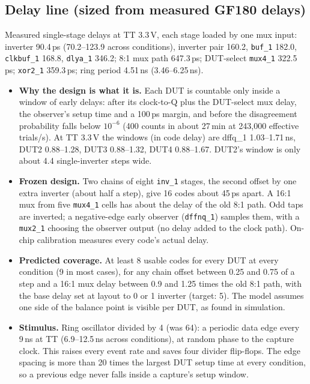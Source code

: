 \documentclass[11pt]{article}
\begin{document}
\subsection{Delay line (sized from measured GF180 delays)}
Measured single-stage delays at TT 3.3\,V, each stage loaded by one mux input: inverter 90.4\,ps (70.2--123.9 across
conditions), inverter pair 160.2, \texttt{buf\_1} 182.0, \texttt{clkbuf\_1} 168.8, \texttt{dlya\_1} 346.2; 8:1 mux path
647.3\,ps; DUT-select \texttt{mux4\_1} 322.5\,ps; \texttt{xor2\_1} 359.3\,ps; ring period 4.51\,ns (3.46--6.25\,ns).
\begin{itemize}
\item \textbf{Why the design is what it is.} Each DUT is countable only inside a window of early delays: after its
  clock-to-Q plus the DUT-select mux delay, the observer's setup time and a 100\,ps margin, and before the
  disagreement probability falls below $10^{-6}$ (400 counts in about 27\,min at 243{,}000 effective trials/s). At TT 3.3\,V the windows (in code delay) are dffq\_1 1.03--1.71\,ns, DUT2 0.88--1.28, DUT3
  0.88--1.32, DUT4 0.88--1.67. DUT2's window is only about 4.4 single-inverter steps wide.
\item \textbf{Frozen design.} Two chains of eight \texttt{inv\_1} stages, the second offset by one extra inverter
  (about half a step), give 16 codes about 45\,ps apart. A 16:1 mux from five \texttt{mux4\_1} cells has about the
  delay of the old 8:1 path. Odd taps are inverted; a negative-edge early observer (\texttt{dffnq\_1}) samples them,
  with a \texttt{mux2\_1} choosing the observer output (no delay added to the clock path). On-chip calibration
  measures every code's actual delay.
\item \textbf{Predicted coverage.} At least 8 usable codes for every DUT at every condition (9 in most cases), for
  any chain offset between 0.25 and 0.75 of a step and a 16:1 mux delay between 0.9 and 1.25 times the old 8:1 path,
  with the base delay set at layout to 0 or 1 inverter (target: 5). The model assumes one side of the balance point is
  visible per DUT, as found in simulation.
\item \textbf{Stimulus.} Ring oscillator divided by 4 (was 64): a periodic data edge every 9\,ns at TT
  (6.9--12.5\,ns across conditions), at random phase to the capture clock. This raises every event rate and saves
  four divider flip-flops. The edge spacing is more than 20 times the largest DUT setup time at every condition,
  so a previous edge never falls inside a capture's setup window.
\end{itemize}
\end{document}
